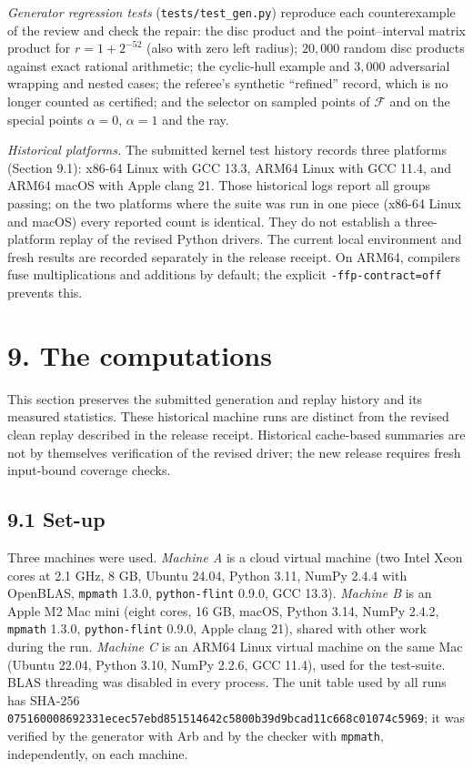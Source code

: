 \documentclass[
  11pt,
]{article}
\begin{document}
\emph{Generator regression tests} (\texttt{tests/test\_gen.py})
reproduce each counterexample of the review and check the repair: the
disc product and the point--interval matrix product for \(r=1+2^{-52}\)
(also with zero left radius); \(20{,}000\) random disc products against
exact rational arithmetic; the cyclic-hull example and \(3{,}000\)
adversarial wrapping and nested cases; the referee's synthetic
``refined'' record, which is no longer counted as certified; and the
selector on sampled points of \(\mathcal F\) and on the special points
\(\alpha=0\), \(\alpha=1\) and the ray.

\emph{Historical platforms.} The submitted kernel test history records
three platforms (Section 9.1): x86-64 Linux with GCC 13.3, ARM64 Linux
with GCC 11.4, and ARM64 macOS with Apple clang 21. Those historical
logs report all groups passing; on the two platforms where the suite was
run in one piece (x86-64 Linux and macOS) every reported count is
identical. They do not establish a three-platform replay of the revised
Python drivers. The current local environment and fresh results are
recorded separately in the release receipt. On ARM64, compilers fuse
multiplications and additions by default; the explicit
\texttt{-ffp-contract=off} prevents this.

\section{9. The computations}\label{the-computations}

This section preserves the submitted generation and replay history and
its measured statistics. These historical machine runs are distinct from
the revised clean replay described in the release receipt. Historical
cache-based summaries are not by themselves verification of the revised
driver; the new release requires fresh input-bound coverage checks.

\subsection{9.1 Set-up}\label{set-up}

Three machines were used. \emph{Machine A} is a cloud virtual machine
(two Intel Xeon cores at 2.1 GHz, 8 GB, Ubuntu 24.04, Python 3.11, NumPy
2.4.4 with OpenBLAS, \texttt{mpmath} 1.3.0, \texttt{python-flint} 0.9.0,
GCC 13.3). \emph{Machine B} is an Apple M2 Mac mini (eight cores, 16 GB,
macOS, Python 3.14, NumPy 2.4.2, \texttt{mpmath} 1.3.0,
\texttt{python-flint} 0.9.0, Apple clang 21), shared with other work
during the run. \emph{Machine C} is an ARM64 Linux virtual machine on
the same Mac (Ubuntu 22.04, Python 3.10, NumPy 2.2.6, GCC 11.4), used
for the test-suite. BLAS threading was disabled in every process. The
unit table used by all runs has SHA-256
\texttt{075160008692331ecec57ebd851514642c5800b39d9bcad11c668c01074c5969};
it was verified by the generator with Arb and by the checker with
\texttt{mpmath}, independently, on each machine.
\end{document}
